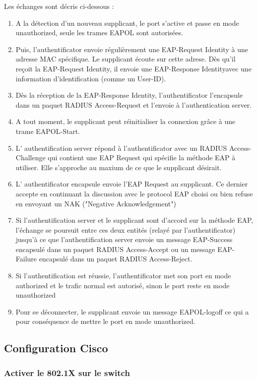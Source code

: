 Les échanges sont décris ci-dessous :\\
\begin{enumerate}
\item A la détection d'un nouveau supplicant, le port s'active et passe en mode unauthorized, seule les trames EAPOL sont autorisées.
\item Puis, l'authentificator envoie régulièrement une EAP-Request Identity à une adresse MAC spécifique. Le supplicant écoute sur cette adrese. Dès qu'il reçoit la EAP-Request Identity, il envoie une EAP-Response Identityavec une information d'identification (comme un User-ID).
\item Dès la réception de la EAP-Response Identity, l'authentificator l'encapsule dans un paquet RADIUS Access-Request et l'envoie à l'authentication server.
\item A tout moment, le supplicant peut réinitialiser la connexion grâce à une trame EAPOL-Start.
\item L' authentification server répond à l'authentificator avec un RADIUS Access-Challenge qui contient une EAP Request qui spécifie la méthode EAP à utiliser. Elle s'approche au maxium de ce que le supplicant désirait.
\item L' authentificator encapsule envoie l'EAP Request au supplicant. Ce dernier accepte en continuant la discussion avec le protocol EAP choisi ou bien refuse en envoyant un NAK ("Negative Acknowledgement") 
\item Si l'authentification server et le supplicant sont d'accord sur la méthode EAP, l'échange se poursuit entre ces deux entités (relayé par l'authentificator) jusqu'à ce que l'authentification server envoie un message  EAP-Success encapsulé dans un paquet RADIUS Access-Accept ou un message  EAP-Failure encapsulé dans un paquet  RADIUS Access-Reject.
\item Si l'authentification est réussie, l'authentificator met son port en mode authorized et le trafic normal est autorisé, sinon le port reste en mode unauthorized
\item Pour se déconnecter, le supplicant envoie un message EAPOL-logoff ce qui a pour conséquence de mettre le port en mode unauthorized.
\end{enumerate}

\subsection{Configuration Cisco}
\subsubsection{Activer le 802.1X sur le switch}

